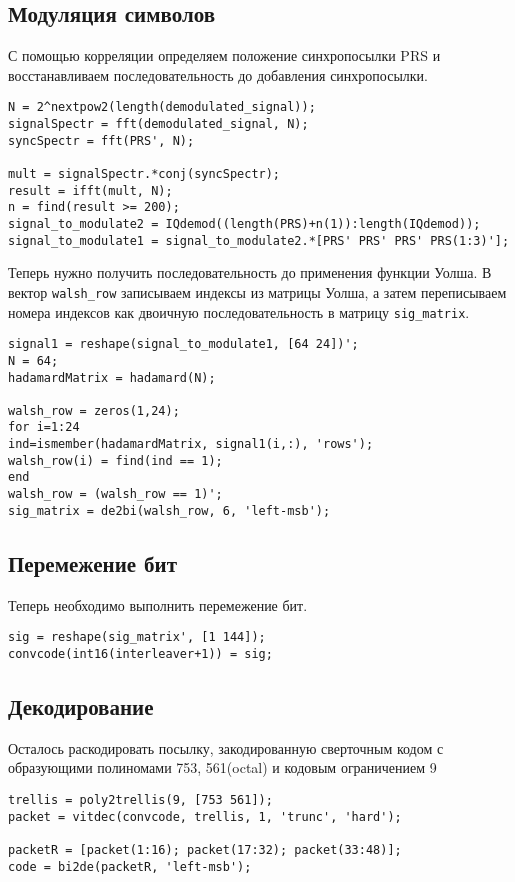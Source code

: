 \subsection{Модуляция символов}
С помощью корреляции определяем положение синхропосылки PRS и восстанавливаем последовательность до добавления синхропосылки.
\begin{lstlisting}
N = 2^nextpow2(length(demodulated_signal));
signalSpectr = fft(demodulated_signal, N);
syncSpectr = fft(PRS', N);

mult = signalSpectr.*conj(syncSpectr);
result = ifft(mult, N);
n = find(result >= 200);
signal_to_modulate2 = IQdemod((length(PRS)+n(1)):length(IQdemod));
signal_to_modulate1 = signal_to_modulate2.*[PRS' PRS' PRS' PRS(1:3)'];
\end{lstlisting}
Теперь нужно получить последовательность до применения функции Уолша. В вектор \verb|walsh_row| записываем индексы из матрицы Уолша, а затем переписываем номера индексов как двоичную последовательность в матрицу \verb|sig_matrix|.
\begin{lstlisting}
signal1 = reshape(signal_to_modulate1, [64 24])';
N = 64;
hadamardMatrix = hadamard(N);

walsh_row = zeros(1,24);
for i=1:24
ind=ismember(hadamardMatrix, signal1(i,:), 'rows');
walsh_row(i) = find(ind == 1);
end
walsh_row = (walsh_row == 1)';
sig_matrix = de2bi(walsh_row, 6, 'left-msb');
\end{lstlisting}

\subsection{Перемежение бит}
Теперь необходимо выполнить перемежение бит.
\begin{lstlisting}
sig = reshape(sig_matrix', [1 144]);
convcode(int16(interleaver+1)) = sig;
\end{lstlisting}

\subsection{Декодирование}
Осталось раскодировать посылку, закодированную сверточным кодом с образующими полиномами 753, 561(octal) и кодовым ограничением 9
\begin{lstlisting}
trellis = poly2trellis(9, [753 561]);
packet = vitdec(convcode, trellis, 1, 'trunc', 'hard');

packetR = [packet(1:16); packet(17:32); packet(33:48)];
code = bi2de(packetR, 'left-msb');
\end{lstlisting}

